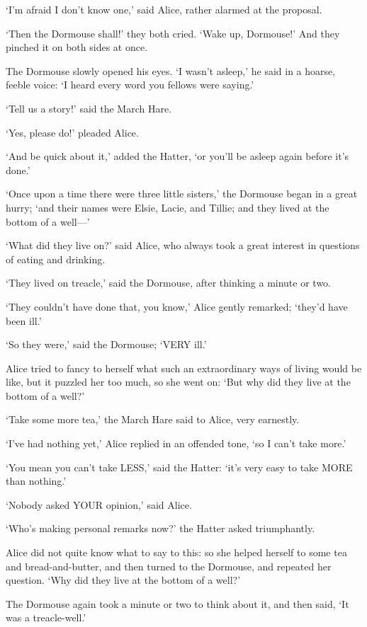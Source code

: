 \documentclass[12pt]{book}
\begin{document}
\begin{Parallel}[p]{}{}
{‘I’m afraid I don’t know one,’ said Alice, rather alarmed at the proposal.

‘Then the Dormouse shall!’ they both cried. ‘Wake up, Dormouse!’ And they pinched it on both sides at once.

The Dormouse slowly opened his eyes. ‘I wasn’t asleep,’ he said in a hoarse, feeble voice: ‘I heard every word you fellows were saying.’

‘Tell us a story!’ said the March Hare.

‘Yes, please do!’ pleaded Alice.

‘And be quick about it,’ added the Hatter, ‘or you’ll be asleep again before it’s done.’

‘Once upon a time there were three little sisters,’ the Dormouse began in a great hurry; ‘and their names were Elsie, Lacie, and Tillie; and they lived at the bottom of a well—’

‘What did they live on?’ said Alice, who always took a great interest in questions of eating and drinking.

‘They lived on treacle,’ said the Dormouse, after thinking a minute or two.

‘They couldn’t have done that, you know,’ Alice gently remarked; ‘they’d have been ill.’

‘So they were,’ said the Dormouse; ‘VERY ill.’

Alice tried to fancy to herself what such an extraordinary ways of living would be like, but it puzzled her too much, so she went on: ‘But why did they live at the bottom of a well?’

‘Take some more tea,’ the March Hare said to Alice, very earnestly.

‘I’ve had nothing yet,’ Alice replied in an offended tone, ‘so I can’t take more.’

‘You mean you can’t take LESS,’ said the Hatter: ‘it’s very easy to take MORE than nothing.’

‘Nobody asked YOUR opinion,’ said Alice.

‘Who’s making personal remarks now?’ the Hatter asked triumphantly.

Alice did not quite know what to say to this: so she helped herself to some tea and bread-and-butter, and then turned to the Dormouse, and repeated her question. ‘Why did they live at the bottom of a well?’

The Dormouse again took a minute or two to think about it, and then said, ‘It was a treacle-well.’

}
\end{Parallel}
\end{document}
